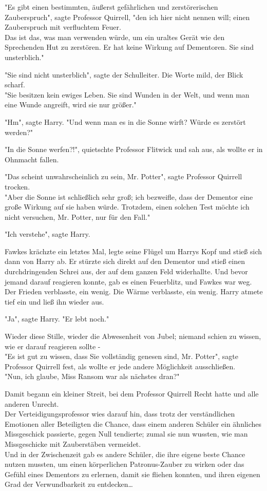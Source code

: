 {"Es gibt einen bestimmten, äußerst gefährlichen und zerstörerischen Zauberspruch", sagte Professor Quirrell, "den ich hier nicht nennen will; einen Zauberspruch mit verfluchtem Feuer.\\ Das ist das, was man verwenden würde, um ein uraltes Gerät wie den Sprechenden Hut zu zerstören. Er hat keine Wirkung auf Dementoren. Sie sind unsterblich."

"Sie sind nicht unsterblich", sagte der Schulleiter. Die Worte mild, der Blick scharf.\\ "Sie besitzen kein ewiges Leben. Sie sind Wunden in der Welt, und wenn man eine Wunde angreift, wird sie nur größer."

"Hm", sagte Harry. "Und wenn man es in die Sonne wirft? Würde es zerstört werden?"

"In die Sonne werfen?!", quietschte Professor Flitwick und sah aus, als wollte er in Ohnmacht fallen.

"Das scheint unwahrscheinlich zu sein, Mr. Potter", sagte Professor Quirrell trocken.\\ "Aber die Sonne ist schließlich sehr groß; ich bezweifle, dass der Dementor eine große Wirkung auf sie haben würde. Trotzdem, einen solchen Test möchte ich nicht versuchen, Mr. Potter, nur für den Fall."

"Ich verstehe", sagte Harry.

Fawkes krächzte ein letztes Mal, legte seine Flügel um Harrys Kopf und stieß sich dann von Harry ab. Er stürzte sich direkt auf den Dementor und stieß einen durchdringenden Schrei aus, der auf dem ganzen Feld widerhallte. Und bevor jemand darauf reagieren konnte, gab es einen Feuerblitz, und Fawkes war weg. Der Frieden verblasste, ein wenig. Die Wärme verblasste, ein wenig. Harry atmete tief ein und ließ ihn wieder aus.

"Ja", sagte Harry. "Er lebt noch."

Wieder diese Stille, wieder die Abwesenheit von Jubel; niemand schien zu wissen, wie er darauf reagieren sollte -\\ "Es ist gut zu wissen, dass Sie vollständig genesen sind, Mr. Potter", sagte Professor Quirrell fest, als wollte er jede andere Möglichkeit ausschließen.\\ "Nun, ich glaube, Miss Ransom war als nächstes dran?"

Damit begann ein kleiner Streit, bei dem Professor Quirrell Recht hatte und alle anderen Unrecht.\\ Der Verteidigungsprofessor wies darauf hin, dass trotz der verständlichen Emotionen aller Beteiligten die Chance, dass einem anderen Schüler ein ähnliches Missgeschick passierte, gegen Null tendierte; zumal sie nun wussten, wie man Missgeschicke mit Zauberstäben vermeidet.\\ Und in der Zwischenzeit gab es andere Schüler, die ihre eigene beste Chance nutzen mussten, um einen körperlichen Patronus-Zauber zu wirken oder das Gefühl eines Dementors zu erlernen, damit sie fliehen konnten, und ihren eigenen Grad der Verwundbarkeit zu entdecken…

}

